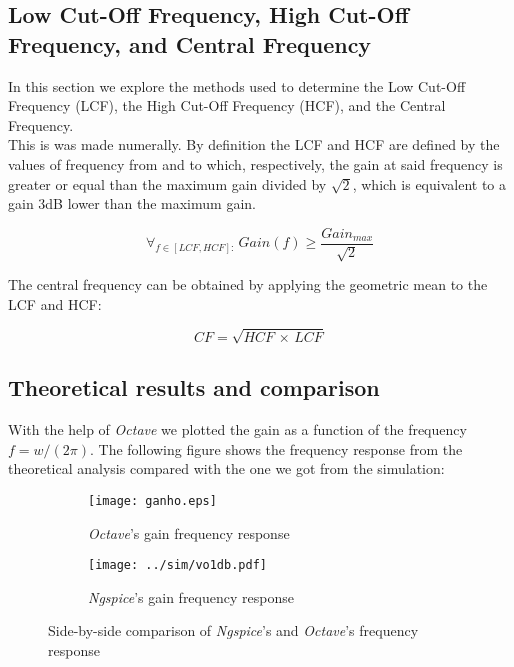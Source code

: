 \subsection{Low Cut-Off Frequency, High Cut-Off Frequency, and Central Frequency}
In this section we explore the methods used to determine the Low Cut-Off Frequency (LCF), the High Cut-Off Frequency (HCF), and the Central Frequency.\\
This is was made numerally. By definition the LCF and HCF are defined by the values of frequency from and to which, respectively, the gain at said frequency is greater or equal than the maximum gain divided by $\sqrt{2}$, which is equivalent to a gain 3dB lower than the maximum gain.


\begin{equation}
  \forall_{f\in[LCF, HCF]:}\,Gain(f)\geq \frac{Gain_{max}}{\sqrt{2}}
\label{Eq:ganho_freq}
\end{equation}

The central frequency can be obtained by applying the geometric mean to the LCF and HCF:


\begin{equation}
  CF=\sqrt{HCF\, \times \, LCF}
\label{Eq:freq_cental}
\end{equation}

\subsection{Theoretical results and comparison}

With the help of \textit{Octave} we plotted the gain as a function of the frequency $f=w/(2\pi)$. The following figure shows the frequency response from the theoretical analysis compared with the one we got from the simulation:
\begin{figure}[H]
\centering
\begin{subfigure}{.5\textwidth}
  \centering
  \texttt{[image: ganho.eps]}
  \caption{\textit{Octave}'s gain frequency response}
  \label{fig:Ngspicegain(f)}
\end{subfigure}%
\begin{subfigure}{.5\textwidth}
  \centering
  \texttt{[image: ../sim/vo1db.pdf]}
  \caption{\textit{Ngspice}'s gain frequency response}
  \label{fig:Ngspicegain(f)}
\end{subfigure}
\caption{Side-by-side comparison of \textit{Ngspice}'s and \textit{Octave}'s frequency response}
\label{fig:Gaincomparison}
\end{figure}

